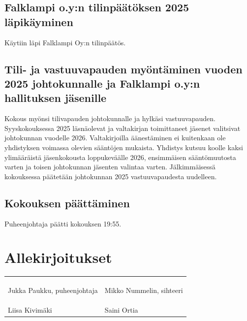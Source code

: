 \documentclass[a4paper,12pt]{article}
\begin{document}
\subsection{Falklampi o.y:n tilinpäätöksen 2025 läpikäyminen}
Käytiin läpi Falklampi Oy:n tilinpäätös.
\subsection{Tili- ja vastuuvapauden myöntäminen vuoden 2025 johtokunnalle ja Falklampi o.y:n hallituksen jäsenille}
Kokous myönsi tilivapauden johtokunnalle ja hylkäsi vastuuvapauden.
Syyskokouksessa 2025 läsnäolevat ja valtakirjan toimittaneet jäsenet valitsivat johtokunnan vuodelle 2026. Valtakirjoilla äänestäminen ei kuitenkaan ole yhdistyksen voimassa olevien sääntöjen mukaista. Yhdistys kutsuu koolle kaksi ylimääräistä jäsenkokousta loppukeväälle 2026, ensimmäisen sääntömuutosta varten ja toisen johtokunnan jäsenten valintaa varten. Jälkimmäisessä kokouksessa päätetään johtokunnan 2025 vastuuvapaudesta uudelleen.
\subsection{Kokouksen päättäminen}
Puheenjohtaja päätti kokouksen 19:55.
\section*{Allekirjoitukset}
\begin{flushleft}
\begin{tabular}{ll}
& \\
& \\
& \\
Jukka Paukku, puheenjohtaja &
Mikko Nummelin, sihteeri \\
& \\
& \\
& \\
Liisa Kivimäki &
Saini Ortia
\end{tabular}
\end{flushleft}
\end{document}
